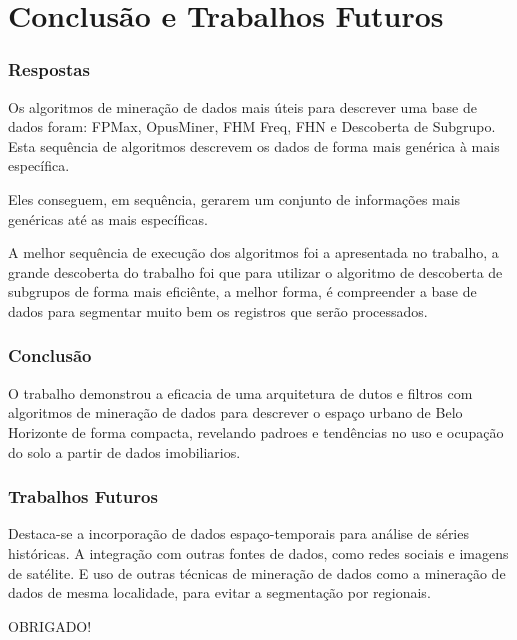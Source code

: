 \section{Conclusão e Trabalhos Futuros}


\begin{frame}

    \frametitle{Respostas}

    \begin{questions}
        \item Os algoritmos de mineração de dados mais úteis para descrever uma base de dados foram: FPMax, OpusMiner, FHM Freq, FHN e Descoberta de Subgrupo. Esta sequência de algoritmos descrevem os dados de forma mais genérica à mais específica.
        \item Eles conseguem, em sequência, gerarem um conjunto de informações mais genéricas até as mais específicas.
        \item A melhor sequência de execução dos algoritmos foi a apresentada no trabalho, a grande descoberta do trabalho foi que para utilizar o algoritmo de descoberta de subgrupos de forma mais eficiênte, a melhor forma, é compreender a base de dados para segmentar muito bem os registros que serão processados.
\end{questions}

\end{frame}


\begin{frame}

    \frametitle{Conclusão}

    O trabalho demonstrou a eficacia de uma arquitetura de dutos e filtros com algoritmos de mineração de dados para descrever o espaço urbano de Belo Horizonte de forma compacta, revelando padroes e tendências no uso e ocupação do solo a partir de dados imobiliarios.

\end{frame}


\begin{frame}

    \frametitle{Trabalhos Futuros}

	Destaca-se a incorporação de dados espaço-temporais para análise de séries históricas.
	\newline
	\newline
	A integração com outras fontes de dados, como redes sociais e imagens de satélite.
	\newline
	\newline
	E uso de outras técnicas de mineração de dados como a mineração de dados de mesma localidade, para evitar a segmentação por regionais.
\end{frame}


\begin{frame}
    \begin{center}
        \Huge{OBRIGADO!}
    \end{center}
\end{frame}
